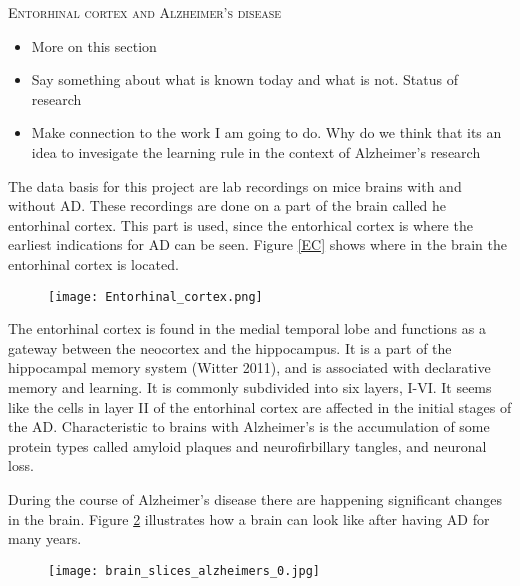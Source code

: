 \textsc{Entorhinal cortex and Alzheimer's disease}

\begin{itemize}
    \item More on this section
    \item Say something about what is known today and what is not. Status of research
    \item Make connection to the work I am going to do. Why do we think that its an idea to invesigate the learning rule in the context of Alzheimer's research
\end{itemize}

The data basis for this project are lab recordings on mice brains with and without AD. These recordings are done on a part of the brain called he entorhinal cortex. This part is used, since the entorhical cortex is where the earliest indications for AD can be seen. Figure \ref{EC} shows where in the brain the entorhinal cortex is located. 


\begin{figure}[h]
    \caption{}
    \label{EC}
    \centering
    \texttt{[image: Entorhinal\_cortex.png]}
    \label{brain}
\end{figure} 

The entorhinal cortex is found in the medial temporal lobe and functions as a gateway between the neocortex and the hippocampus. It is a part of the hippocampal memory system (Witter 2011), and is associated with declarative memory and learning. It is commonly subdivided into six layers, I-VI. It seems like the cells in layer II of the entorhinal cortex are affected in the initial stages of the AD. Characteristic to brains with Alzheimer's is the accumulation of some protein types called amyloid plaques and neurofirbillary tangles, and neuronal loss. 

During the course of Alzheimer's disease there are happening significant changes in the brain. Figure \ref{brain1} illustrates how a brain can look like after having AD for many years.


\begin{figure}[h]
    \label{brain1}
    \centering
    \texttt{[image: brain\_slices\_alzheimers\_0.jpg]}

\end{figure} 


